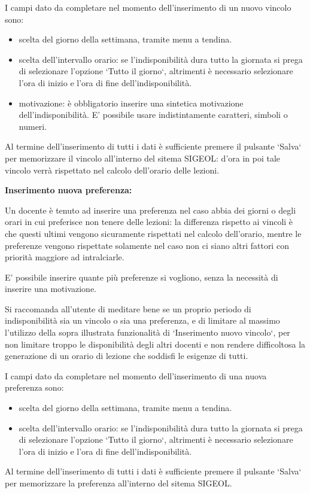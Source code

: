 \documentclass[11pt,a4paper]{article}
\begin{document}
I campi dato da completare nel momento dell'inserimento di un nuovo vincolo sono:
\begin{itemize}
 \item scelta del giorno della settimana, tramite menu a tendina.
 \item scelta dell'intervallo orario: se l'indisponibilità dura tutto la giornata si prega di selezionare l'opzione `Tutto il giorno`, altrimenti è necessario selezionare l'ora di inizio e l'ora di fine dell'indisponibilità.
 \item motivazione: è obbligatorio inserire una sintetica motivazione dell'indisponibilità. E' possibile usare indistintamente caratteri, simboli o numeri.
\end{itemize}
Al termine dell'inserimento di tutti i dati è sufficiente premere il pulsante `Salva` per memorizzare il vincolo all'interno del sitema SIGEOL: d'ora in poi tale vincolo verrà rispettato nel calcolo dell'orario delle lezioni.
\newline \newline \newline
\begin{large}\textbf{Inserimento nuova preferenza:}\end{large}
\newline \newline
Un docente è tenuto ad inserire una preferenza nel caso abbia dei giorni o degli orari in cui preferisce non tenere delle lezioni: la differenza rispetto ai vincoli è che questi ultimi vengono sicuramente rispettati nel calcolo dell'orario, mentre le preferenze vengono rispettate solamente nel caso non ci siano altri fattori con priorità maggiore ad intralciarle.

E' possibile inserire quante più preferenze si vogliono, senza la necessità di inserire una motivazione.

Si raccomanda all'utente di meditare bene se un proprio periodo di indisponibilità sia un vincolo o sia una preferenza, e di limitare al massimo l'utilizzo della sopra illustrata funzionalità di `Inserimento nuovo vincolo`, per non limitare troppo le disponibilità degli altri docenti e non rendere difficoltosa la generazione di un orario di lezione che soddisfi le esigenze di tutti.

I campi dato da completare nel momento dell'inserimento di una nuova preferenza sono:
\begin{itemize}
 \item scelta del giorno della settimana, tramite menu a tendina.
 \item scelta dell'intervallo orario: se l'indisponibilità dura tutto la giornata si prega di selezionare l'opzione `Tutto il giorno`, altrimenti è necessario selezionare l'ora di inizio e l'ora di fine dell'indisponibilità.
\end{itemize}
Al termine dell'inserimento di tutti i dati è sufficiente premere il pulsante `Salva` per memorizzare la preferenza all'interno del sitema SIGEOL.
\end{document}
